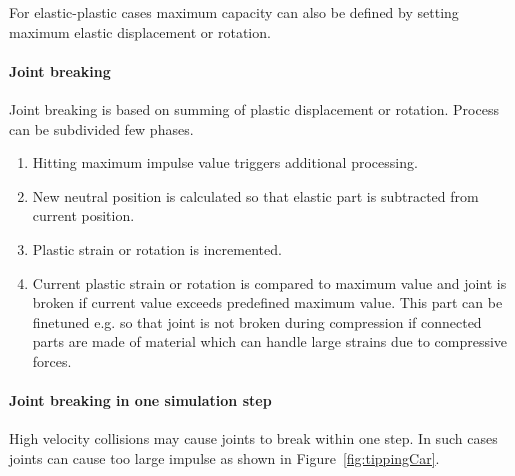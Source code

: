 \documentclass{jcgt}
\begin{document}
For elastic-plastic cases maximum capacity can also be defined by setting maximum elastic 
displacement or rotation.

\paragraph{Joint breaking}
Joint breaking is based on summing of plastic displacement or rotation.
Process can be subdivided few phases.

\begin{enumerate}
\item Hitting maximum impulse value triggers additional processing.
\item New neutral position is calculated so that elastic part is subtracted from current position.
\item Plastic strain or rotation is incremented.
\item Current plastic strain or rotation is compared to maximum value and joint is broken if 
current value exceeds predefined maximum value. This part can be finetuned e.g. so that joint is 
not broken during compression if connected parts are made of material which can handle large
strains due to compressive forces. 
\end{enumerate}

\paragraph{Joint breaking in one simulation step} High velocity collisions may cause joints to break within one step.
In such cases joints can cause too large impulse as shown in  Figure~\ref{fig:tippingCar}.
\end{document}
